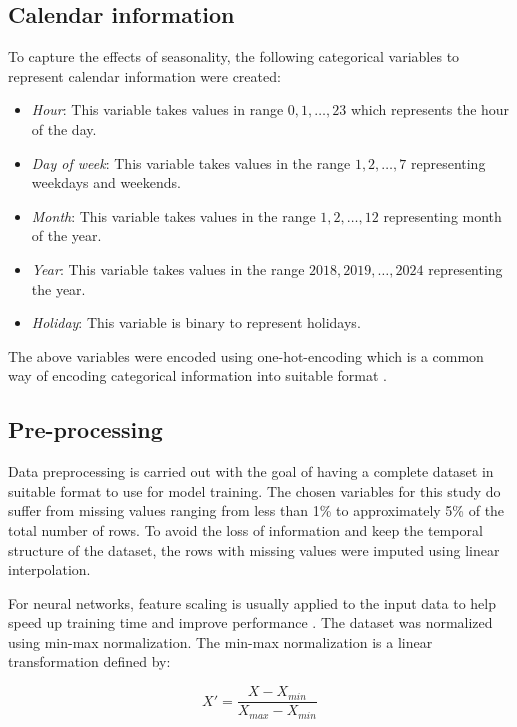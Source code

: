 \subsection{Calendar information}
To capture the effects of seasonality, the following categorical variables to represent calendar information were created:

\begin{itemize}
    \item \textit{Hour}: This variable takes values in range $0, 1, \dots, 23$ which represents the hour of the day.
    \item \textit{Day of week}: This variable takes values in the range $1, 2, \dots, 7$ representing weekdays and weekends. 
    \item \textit{Month}: This variable takes values in the range $1, 2, \dots, 12$ representing month of the year. 
    \item \textit{Year}: This variable takes values in the range $2018, 2019, \dots, 2024$ representing the year. 
    \item \textit{Holiday}: This variable is binary to represent holidays.
\end{itemize}

The above variables were encoded using one-hot-encoding which is a common way of encoding categorical information into suitable format \cite{WAGNER2022100246}. 

\subsection{Pre-processing}
Data preprocessing is carried out with the goal of having a complete dataset in suitable format to use for model training. The chosen variables for this study do suffer from missing values ranging from less than 1\% to approximately 5\% of the total number of rows. To avoid the loss of information and keep the temporal structure of the dataset, the rows with missing values were imputed using linear interpolation. 

For neural networks, feature scaling is usually applied to the input data to help speed up training time and improve performance \cite{coupling}. The dataset was normalized using min-max normalization. The min-max normalization is a linear transformation defined by: 

\begin{equation}
    X' = \frac{X - X_{min}}{X_{max} - X_{min}}
\end{equation}

